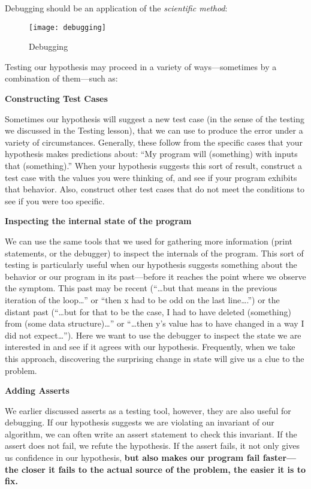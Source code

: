 \documentclass[11pt, a4paper]{article}
\begin{document}
Debugging should be an application of the \textit{scientific method}:


\begin{figure}[htpb!]
  \centering
  \texttt{[image: debugging]}
  \caption{Debugging}
  \label{fig:debugging}
\end{figure}






Testing our hypothesis may proceed in a variety of ways—sometimes by a combination of them—such as:


\textbf{Constructing Test Cases}

Sometimes our hypothesis will suggest a new test case (in the sense of the testing we discussed in the Testing lesson), that we can use to produce the error under a variety of circumstances. Generally, these follow from the specific cases that your hypothesis makes predictions about: “My program will (something) with inputs that (something).” When your hypothesis suggests this sort of result, construct a test case with the values you were thinking of, and see if your program exhibits that behavior. Also, construct other test cases that do not meet the conditions to see if you were too specific.


\textbf{Inspecting the internal state of the program}


We can use the same tools that we used for gathering more information (print statements, or the debugger) to inspect the internals of the program. This sort of testing is particularly useful when our hypothesis suggests something about the behavior or our program in its past—before it reaches the point where we observe the symptom. This past may be recent (“…but that means in the previous iteration of the loop…” or “then x had to be odd on the last line….”) or the distant past (“…but for that to be the case, I had to have deleted (something) from (some data structure)…” or “…then y’s value has to have changed in a way I did not expect…”). Here we want to use the debugger to inspect the state we are interested in and see if it agrees with our hypothesis. Frequently, when we take this approach, discovering the surprising change in state will give us a clue to the problem.


\textbf{Adding Asserts}


We earlier discussed asserts as a testing tool, however, they are also useful for debugging. If our hypothesis suggests we are violating an invariant of our algorithm, we can often write an assert statement to check this invariant. If the assert does not fail, we refute the hypothesis. If the assert fails, it not only gives us confidence in our hypothesis, \textbf{but also makes our program fail faster—the closer it fails to the actual source of the problem, the easier it is to fix.}
\end{document}
